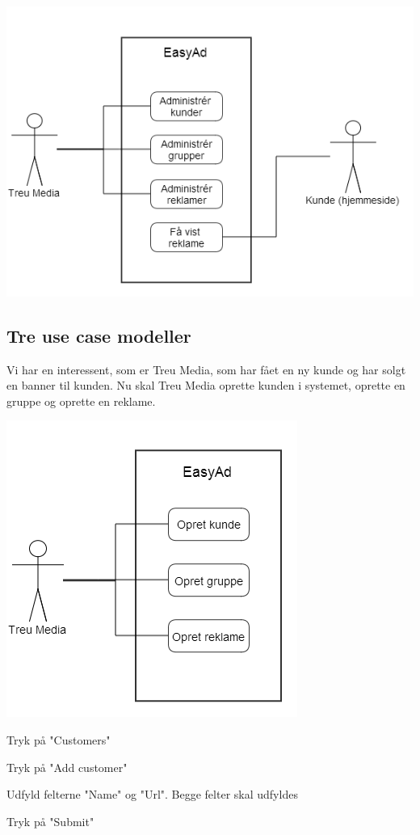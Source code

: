\documentclass[a4paper,12pt]{article}
\begin{document}
\includegraphics[width=\linewidth]{use_case.png}

\subsection{Tre use case modeller}
Vi har en interessent, som er Treu Media, som har fået en ny kunde og har solgt en banner til kunden. Nu skal Treu Media oprette kunden i systemet, oprette en gruppe og oprette en reklame.

\includegraphics[scale=0.5]{three_use_cases.png}

\begin{usecase}
 {
	\item Tryk på "Customers"
	\item Tryk på "Add customer"
	\item Udfyld felterne "Name" og "Url". Begge felter skal udfyldes
	\item Tryk på "Submit"
}
\end{usecase}
\end{document}
